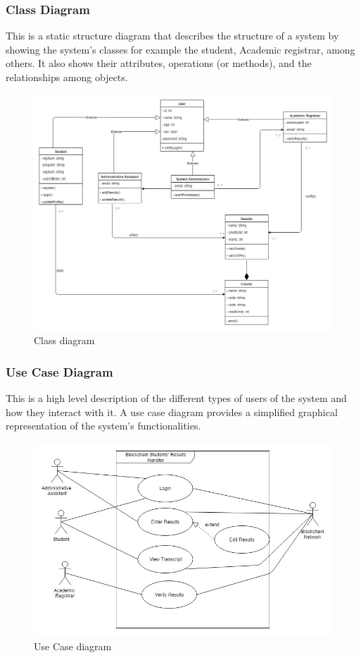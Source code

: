 \subsubsection{Class Diagram}
This is a static structure diagram that describes the structure of a system by showing the system's classes for example the student, Academic registrar, among others. It also shows their attributes, operations (or methods), and the relationships among objects.

\begin{figure}[!h]
\includegraphics[scale=0.4]{images/class.jpg}
\caption{Class diagram}
\end{figure}

\subsubsection{Use Case Diagram}
This is a high level description of the different types of users of the system and how they interact with it. A use case diagram provides a simplified graphical representation of the system’s functionalities.

\begin{figure}[!h]
\includegraphics[scale=0.5]{images/Usecase.jpg}
\caption{Use Case diagram}
\end{figure}

